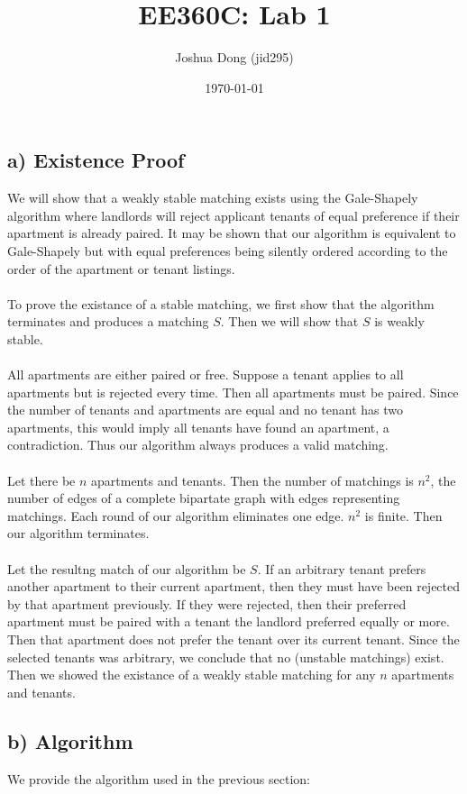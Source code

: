 \documentclass{article}
\begin{document}
\title{EE360C: Lab 1}
\author{Joshua Dong (jid295)}
\date{\today}
\maketitle

\subsection*{a) Existence Proof}
We will show that a weakly stable matching exists using the Gale-Shapely
algorithm where landlords will reject applicant tenants of equal preference if
their apartment is already paired. It may be shown that our algorithm is
equivalent to Gale-Shapely but with equal preferences being silently ordered
according to the order of the apartment or tenant listings.
\\\\
To prove the existance of a stable matching, we first show that the algorithm
terminates and produces a matching $S$. Then we will show that $S$ is weakly
stable.
\\\\
All apartments are either paired or free. Suppose a tenant applies to all
apartments but is rejected every time. Then all apartments must be paired.
Since the number of tenants and apartments are equal and no tenant has
two apartments, this would imply all tenants have found an apartment,
a contradiction. Thus our algorithm always produces a valid matching.
\\\\
Let there be $n$ apartments and tenants. Then the number of matchings is
$n^2$, the number of edges of a complete bipartate graph with edges
representing matchings. Each round of our algorithm eliminates one edge.
$n^2$ is finite. Then our algorithm terminates.
\\\\
Let the resultng match of our algorithm be $S$. If an arbitrary tenant prefers
another apartment to their current apartment, then they must have been
rejected by that apartment previously. If they were rejected, then their
preferred apartment must be paired with a tenant the landlord preferred
equally or more. Then that apartment does not prefer the tenant over its
current tenant. Since the selected tenants was arbitrary, we conclude that
no (unstable matchings) exist. Then we showed the existance of a weakly stable
matching for any $n$ apartments and tenants.


\newpage
\subsection*{b) Algorithm}
We provide the algorithm used in the previous section:
\end{document}
